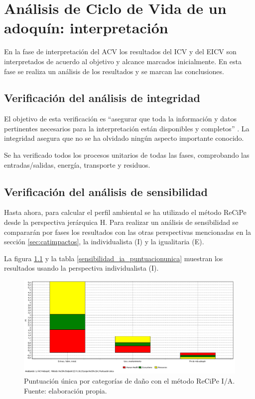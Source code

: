 \chapter{Análisis de Ciclo de Vida de un adoquín: interpretación}\label{cap:acv_interpretacion}

En la fase de interpretación del ACV los resultados del ICV y del EICV son interpretados de acuerdo al objetivo y alcance marcados inicialmente. En esta fase se realiza un análisis de los resultados y se marcan las conclusiones.

\section{Verificación del análisis de integridad}

El objetivo de esta verificación es ``asegurar que toda la información y datos pertinentes necesarios para la interpretación están disponibles y completos'' \cite{iso14044}. La integridad asegura que no se ha olvidado ningún aspecto importante conocido.

Se ha verificado todos los procesos unitarios de todas las fases, comprobando las entradas/salidas, energía, transporte y residuos.

\section{Verificación del análisis de sensibilidad}

Hasta ahora, para calcular el perfil ambiental se ha utilizado el método ReCiPe desde la perspectiva jerárquica H. Para realizar un análisis de sensibilidad se compararán por fases los resultados con las otras perspectivas mencionadas en la sección \ref{sec:catimpactos}, la individualista (I) y la igualitaria (E).

La figura \ref{fig:sensibilidad_ia_puntuacionunica} y la tabla \ref{sensibilidad_ia_puntuacionunica} muestran los resultados usando la perspectiva individualista (I).

\begin{figure}[!htb]
\centering
\includegraphics[width=15cm]{img/sensibilidad_ia_puntuacionunica.png}
\caption[Puntuación única por categorías de daño con el método ReCiPe I/A.]{Puntuación única por categorías de daño con el método ReCiPe I/A. Fuente: elaboración propia.}
\label{fig:sensibilidad_ia_puntuacionunica}
\end{figure}


